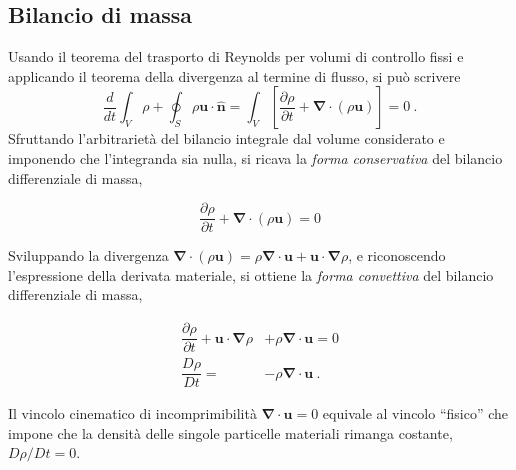 \subsection{Bilancio di massa}
Usando il teorema del trasporto di Reynolds per volumi di controllo fissi e applicando il teorema della divergenza al termine di flusso, si può scrivere
\begin{equation}
 \dfrac{d}{d t} \displaystyle\int_{V} \rho + \oint_{S} \rho \bm{u} \cdot \bm{\hat{n}} = \int_V \left[ \dfrac{\partial \rho}{\partial t} + \bm{\nabla} \cdot (\rho \bm{u})\right] = 0 \ .
\end{equation}
Sfruttando l'arbitrarietà del bilancio integrale dal volume considerato e imponendo che l'integranda sia nulla, si ricava la \textit{forma conservativa} del bilancio differenziale di massa,
\begin{fBox}
\begin{equation}
  \dfrac{\partial \rho}{\partial t} + \bm{\nabla} \cdot (\rho \bm{u}) = 0 
\end{equation}
\end{fBox}
Sviluppando la divergenza $\bm{\nabla} \cdot (\rho \bm{u}) = \rho \bm{\nabla} \cdot \bm{u} + \bm{u} \cdot \bm{\nabla} \rho$, e riconoscendo l'espressione della derivata materiale, si ottiene la \textit{forma convettiva} del bilancio differenziale di massa,
\begin{fBox}
\begin{equation}
\begin{aligned}
 \dfrac{\partial \rho}{\partial t} + \bm{u} \cdot \bm{\nabla} \rho &+ \rho \bm{\nabla} \cdot \bm{u} = 0 \\ 
 \dfrac{D \rho}{D t} = &- \rho \bm{\nabla} \cdot \bm{u} \ .
\end{aligned}
\end{equation}
\end{fBox}
Il vincolo cinematico di incomprimibilità $\bm{\nabla} \cdot \bm{u} = 0$ equivale al vincolo ``fisico'' che impone che la densità delle singole particelle materiali rimanga costante, $D\rho/Dt = 0$.

